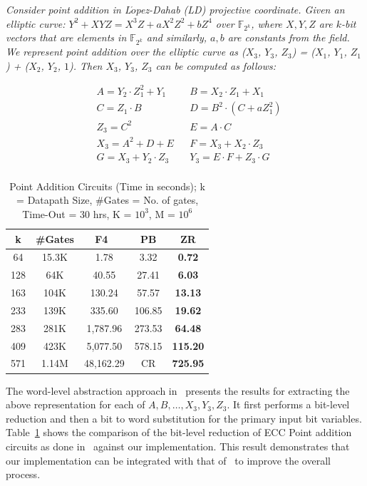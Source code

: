 \begin{Example}
{\it Consider point addition in L$\acute{o}$pez-Dahab (LD) projective coordinate. Given an elliptic curve: $Y^2 + XYZ = X^3Z + aX^2Z^2 + bZ^4$ over $\mathbb{F}_{2^k}$, where $X,Y,Z$ are $k$-bit vectors that are elements in $\mathbb{F}_{2^k}$ and similarly, $a, b$ are constants from the field. We represent point addition over the elliptic curve as ($X_3$, $Y_3$, $Z_3$) = ($X_1$, $Y_1$, $Z_1$) + ($X_2$, $Y_2$, $1$).  Then $X_3$, $Y_3$, $Z_3$ can be computed as follows:} 

\begin{align*}
&A = Y_2 \cdot Z_1^2 + Y_1  &&B = X_2 \cdot Z_1 + X_1 \\
&C = Z_1 \cdot B  &&D = B^2 \cdot(C + a Z_1^2) \\
&Z_3 = C^2 && E = A \cdot C  \\
&X_3 = A^2 + D + E &&F = X_3 + X_2 \cdot Z_3 \\
&G = X_3 + Y_2\cdot Z_3 && Y_3 = E\cdot F + Z_3 \cdot G \\
\end{align*}
\end{Example}

\begin{table}[H]
\centering
\caption{Point Addition Circuits (Time in seconds); k = Datapath Size, \#Gates = No. of gates, Time-Out = 30 hrs, K = $10^3$, M = $10^6$}
\label{pointadd}
\begin{tabular}{| c | c | c | c | c |} \hline
\textbf{k}&\textbf{\#Gates}&\textbf{F4~\cite{pruss:tcad}}&\textbf{PB}&\textbf{ZR} \\ \hline
64&15.3K&1.78&3.32&\textbf{0.72} \\ \hline
128&64K&40.55&27.41&\textbf{6.03} \\ \hline
163&104K&130.24&57.57&\textbf{13.13} \\ \hline
233&139K&335.60&106.85&\textbf{19.62} \\ \hline
283&281K&1,787.96&273.53& \textbf{64.48}\\ \hline
409&423K&5,077.50&578.15& \textbf{115.20}\\ \hline
571&1.14M&48,162.29&CR&\textbf{725.95} \\ \hline
\end{tabular}
\end{table}

The word-level abstraction approach in~\cite{pruss:tcad} presents the results for extracting 
the above representation for each of $A,B,\dots, X_3,Y_3,Z_3$. It first performs a bit-level reduction and then a 
bit to word substitution for the primary input bit variables. Table~\ref{pointadd} shows 
the comparison of the bit-level reduction of ECC Point addition circuits as done in~\cite{pruss:tcad}
against our implementation. 
This result demonstrates that our implementation can be integrated with that of~\cite{pruss:tcad} to improve the overall process.  

